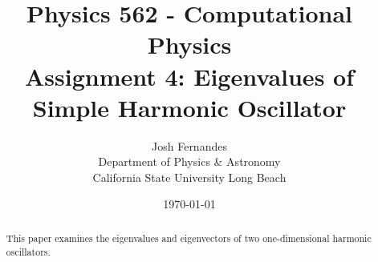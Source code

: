 \documentclass[12pt]{article}
\begin{document}




\title{Physics 562 - Computational Physics\\[.5cm]
Assignment 4: Eigenvalues of Simple Harmonic Oscillator}
\author{Josh Fernandes\\
Department of Physics \& Astronomy\\
California State University Long Beach}
\date{\today}

  
\maketitle



\begin{abstract}
This paper examines the eigenvalues and eigenvectors of two one-dimensional harmonic oscillators. 
\end{abstract}
\end{document}
